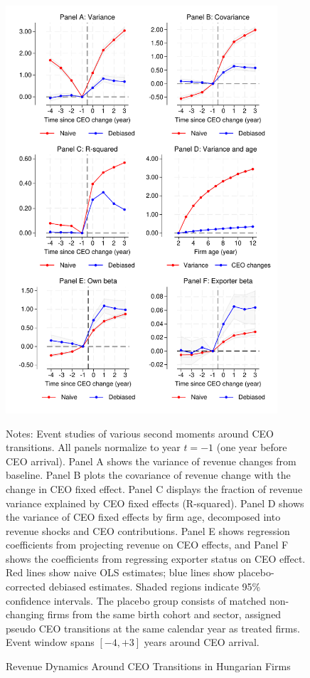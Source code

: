 \documentclass[11pt,a4paper]{article}
\begin{document}
\begin{figure}[htbp]
\centering
\includegraphics[width=0.9\textwidth]{figure/application.pdf}
\caption{Revenue Dynamics Around CEO Transitions in Hungarian Firms}
\label{fig:application}
\vspace{.2cm}

\begin{minipage}{0.9\textwidth}
\footnotesize
Notes: Event studies of various second moments around CEO transitions. All panels normalize to year $t=-1$ (one year before CEO arrival). Panel A shows the variance of revenue changes from baseline. Panel B plots the covariance of revenue change with the change in CEO fixed effect. Panel C displays the fraction of revenue variance explained by CEO fixed effects (R-squared). Panel D shows the variance of CEO fixed effects by firm age, decomposed into revenue shocks and CEO contributions. Panel E shows regression coefficients from projecting revenue on CEO effects, and Panel F shows the coefficients from regressing exporter status on CEO effect. Red lines show naive OLS estimates; blue lines show placebo-corrected debiased estimates. Shaded regions indicate 95\% confidence intervals. The placebo group consists of matched non-changing firms from the same birth cohort and sector, assigned pseudo CEO transitions at the same calendar year as treated firms. Event window spans $[-4, +3]$ years around CEO arrival.
\end{minipage}
\end{figure}
\end{document}
